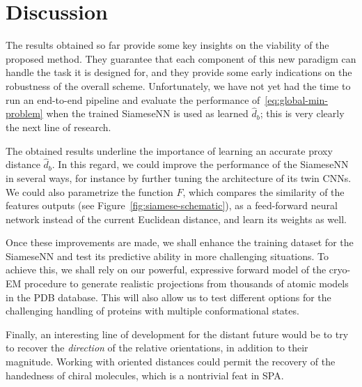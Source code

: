 \section{Discussion}
\label{sec:discussion}

The results obtained so far provide some key insights on the viability of the proposed method. They guarantee that each component of this new paradigm can handle the task it is designed for, and they provide some early indications on the robustness of the overall scheme. Unfortunately, we have not yet had the time to run an end-to-end pipeline and evaluate the performance of~\eqref{eq:global-min-problem} when the trained SiameseNN is used as learned $\widehat{d}_b$; this is very clearly the next line of research. 

The obtained results underline the importance of learning an accurate proxy distance $\widehat{d}_b$. In this regard, we could improve the performance of the SiameseNN in several ways, for instance by further tuning the architecture of its twin CNNs. We could also parametrize the function $F$, which compares the similarity of the features outputs (see Figure~\ref{fig:siamese-schematic}), as a feed-forward neural network instead of the current Euclidean distance, and learn its weights as well. 

Once these improvements are made, we shall enhance the training dataset for the SiameseNN and test its predictive ability in more challenging situations. To achieve this, we shall rely on our powerful, expressive forward model of the cryo-EM procedure to generate realistic projections from thousands of atomic models in the PDB database. This will also allow us to test different options for the challenging handling of proteins with multiple conformational states. 

Finally, an interesting line of development for the distant future would be to try to recover the \textit{direction} of the relative orientations, in addition to their magnitude. Working with oriented distances could permit the recovery of the handedness of chiral molecules, which is a nontrivial feat in SPA. 
